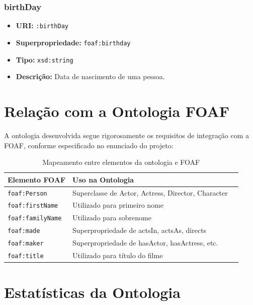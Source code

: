 \documentclass[12pt,a4paper]{article}
\begin{document}
\subsubsection{birthDay}
\begin{itemize}
    \item \textbf{URI:} \texttt{:birthDay}
    \item \textbf{Superpropriedade:} \texttt{foaf:birthday}
    \item \textbf{Tipo:} \texttt{xsd:string}
    \item \textbf{Descrição:} Data de nascimento de uma pessoa.
\end{itemize}

\section{Relação com a Ontologia FOAF}

A ontologia desenvolvida segue rigorosamente os requisitos de integração com a FOAF, conforme especificado no enunciado do projeto:

\begin{table}[H]
\centering
\caption{Mapeamento entre elementos da ontologia e FOAF}
\begin{tabular}{|l|l|l|}
\hline
\textbf{Elemento FOAF} & \textbf{Uso na Ontologia} \\
\hline
\texttt{foaf:Person} & Superclasse de Actor, Actress, Director, Character  \\
\hline
\texttt{foaf:firstName} & Utilizado para primeiro nome \\
\hline
\texttt{foaf:familyName} & Utilizado para sobrenome  \\
\hline
\texttt{foaf:made} & Superpropriedade de actsIn, actsAs, directs \\
\hline
\texttt{foaf:maker} & Superpropriedade de hasActor, hasActress, etc. \\
\hline
\texttt{foaf:title} & Utilizado para título do filme \\
\hline
\end{tabular}
\end{table}

\section{Estatísticas da Ontologia}
\end{document}
